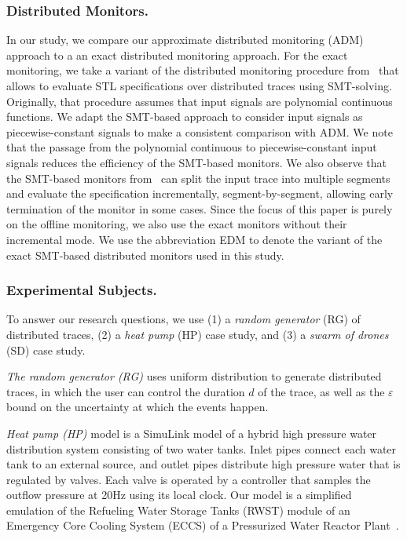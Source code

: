 \subsubsection{Distributed Monitors.}
In our study, we compare our approximate distributed monitoring (ADM) approach to a an exact distributed monitoring approach.
For the exact monitoring, we take a variant of the distributed monitoring procedure from~\cite{MomtazAB23} that allows to evaluate STL specifications over distributed traces using SMT-solving.
Originally, that procedure assumes that input signals are polynomial continuous functions.
We adapt the SMT-based approach to consider input signals as piecewise-constant signals to make a consistent comparison with ADM.
We note that the passage from the polynomial continuous to piecewise-constant input signals reduces the efficiency of the SMT-based monitors.
We also observe that the SMT-based monitors from~\cite{MomtazAB23} can split the input trace into multiple segments and evaluate the specification incrementally, segment-by-segment, allowing early termination of the monitor in some cases.
Since the focus of this paper is purely on the offline monitoring, we also use the exact monitors without their incremental mode.
We use the abbreviation EDM to denote the variant of the exact SMT-based distributed monitors used in this study.


\subsubsection{Experimental Subjects.}
To answer our research questions, we use (1) a \emph{random generator} (RG) of distributed traces, (2) a \emph{heat pump} (HP) case study, and (3) a \emph{swarm of drones} (SD) case study.  

\noindent \emph{The random generator (RG)} uses uniform distribution to generate distributed traces, in which the user can control the duration $d$ of the trace, as well as the $\varepsilon$ bound on the uncertainty at which the events happen.

\noindent \emph{Heat pump (HP)} model is a SimuLink model of a hybrid high pressure water distribution system consisting of two water tanks. Inlet pipes connect each water tank to an external source, and outlet pipes distribute high pressure water that is regulated by valves.
Each valve is operated by a controller that samples the outflow pressure at 20Hz using its local clock. Our model is a simplified emulation of the Refueling Water Storage Tanks (RWST) module of an Emergency Core Cooling System (ECCS) of a Pressurized Water Reactor Plant~\cite{USNRCPWR}.

